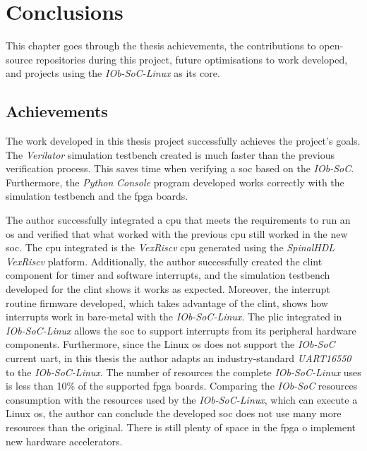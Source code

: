 \chapter{Conclusions}
\label{chapter:conclusions}
This chapter goes through the thesis achievements, the contributions to open-source repositories during this project, future optimisations to work developed, and projects using the \textit{IOb-SoC-Linux} as its core.

\section{Achievements}
\label{section:achievements}
The work developed in this thesis project successfully achieves the project's goals. The \textit{Verilator} simulation testbench created is much faster than the previous verification process. This saves time when verifying a \acrshort{soc} based on the \textit{IOb-SoC}. Furthermore, the \textit{Python} \textit{Console} program developed works correctly with the simulation testbench and the \acrshort{fpga} boards.

The author successfully integrated a \acrshort{cpu} that meets the requirements to run an \acrshort{os} and verified that what worked with the previous \acrshort{cpu} still worked in the new \acrshort{soc}. The \acrshort{cpu} integrated is the \textit{VexRiscv} \acrshort{cpu} generated using the \textit{SpinalHDL} \textit{VexRiscv} platform. Additionally, the author successfully created the \acrshort{clint} component for timer and software interrupts, and the simulation testbench developed for the \acrshort{clint} shows it works as expected. Moreover, the interrupt routine firmware developed, which takes advantage of the \acrshort{clint}, shows how interrupts work in bare-metal with the \textit{IOb-SoC-Linux}. The \acrshort{plic} integrated in \textit{IOb-SoC-Linux} allows the \acrshort{soc} to support interrupts from its peripheral hardware components. Furthermore, since the Linux \acrshort{os} does not support the \textit{IOb-SoC} current \acrshort{uart}, in this thesis the author adapts an industry-standard \textit{UART16550} to the \textit{IOb-SoC-Linux}. The number of resources the complete \textit{IOb-SoC-Linux} uses is less than 10\% of the supported \acrshort{fpga} boards. Comparing the \textit{IOb-SoC} resources consumption with the resources used by the \textit{IOb-SoC-Linux}, which can execute a Linux \acrshort{os}, the author can conclude the developed \acrshort{soc} does not use many more resources than the original. There is still plenty of space in the \acrshort{fpga} o implement new hardware accelerators.


